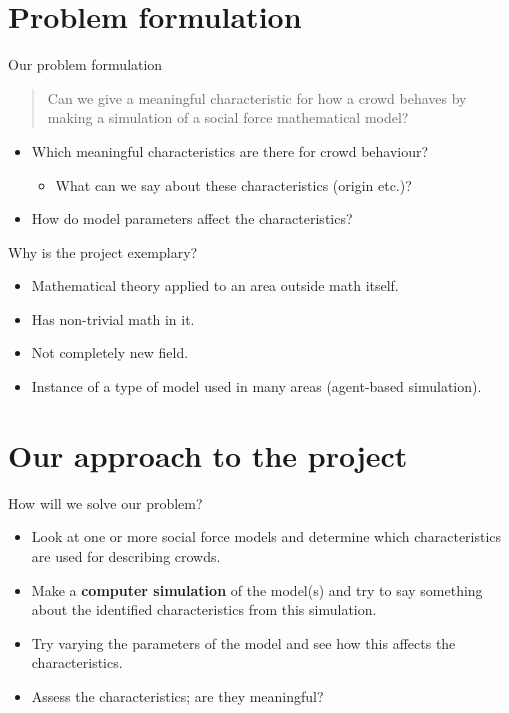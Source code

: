 \documentclass{beamer}
\begin{document}
\section{Problem formulation}
\begin{frame}{Our problem formulation}
    \begin{quote}
        Can we give a meaningful characteristic for how a crowd behaves by 
        making a simulation of a social force mathematical model?
    \end{quote}
    \begin{itemize}
        \item Which meaningful characteristics are there for crowd behaviour?
            \begin{itemize}
                \item What can we say about these characteristics (origin 
                    etc.)?
            \end{itemize}
        \item How do model parameters affect the characteristics?
    \end{itemize}
\end{frame}

\begin{frame}{Why is the project exemplary?}
    \begin{itemize}
        \item Mathematical theory applied to an area outside math itself.
        \item Has non-trivial math in it.
        \item Not completely new field.
        \item Instance of a type of model used in many areas (agent-based 
            simulation).
    \end{itemize}
\end{frame}


\section{Our approach to the project}
\begin{frame}{How will we solve our problem?}
    \begin{itemize}
            \item Look at one or more social force models and determine which 
                characteristics are used for describing crowds.
            \item Make a \textbf{computer simulation} of the model(s) and try 
                to say something about the identified characteristics from 
                this simulation.
            \item Try varying the parameters of the model and see how this 
                affects the characteristics.
            \item Assess the characteristics; are they meaningful?
    \end{itemize}
\end{frame}
\end{document}

